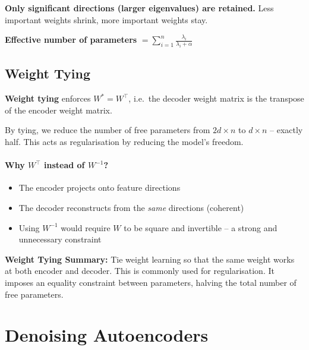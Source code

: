\documentclass[12pt,a4paper]{article}
\begin{document}
\begin{keybox}
\textbf{Only significant directions (larger eigenvalues) are retained.} Less important weights shrink, more important weights stay.

\textbf{Effective number of parameters} $= \displaystyle\sum_{i=1}^{n}\frac{\lambda_i}{\lambda_i + \alpha}$
\end{keybox}

\subsection{Weight Tying}

\begin{definitionbox}
\textbf{Weight tying} enforces $W^* = W^\top$, i.e.\ the decoder weight matrix is the transpose of the encoder weight matrix.
\end{definitionbox}

By tying, we reduce the number of free parameters from $2d\times n$ to $d\times n$ -- exactly half. This acts as regularisation by reducing the model's freedom.

\paragraph{Why $W^\top$ instead of $W^{-1}$?}
\begin{itemize}
  \item The encoder projects onto feature directions
  \item The decoder reconstructs from the \emph{same} directions (coherent)
  \item Using $W^{-1}$ would require $W$ to be square and invertible -- a strong and unnecessary constraint
\end{itemize}

\begin{alertbox}
\textbf{Weight Tying Summary:} Tie weight learning so that the same weight works at both encoder and decoder. This is commonly used for regularisation. It imposes an equality constraint between parameters, halving the total number of free parameters.
\end{alertbox}

\section{Denoising Autoencoders}
\end{document}
